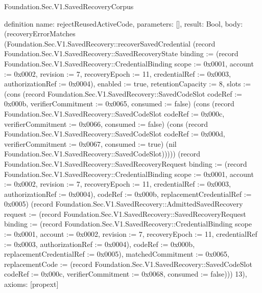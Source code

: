 \begin{lexlean}{Foundation.Sec.V1.SavedRecoveryCorpus}
\begin{semanticmodule}
definition{
  name: rejectReusedActiveCode,
  parameters: [],
  result: Bool,
  body: (recoveryErrorMatches (Foundation.Sec.V1.SavedRecovery::recoverSavedCredential (record Foundation.Sec.V1.SavedRecovery::SavedRecoveryState {binding := (record Foundation.Sec.V1.SavedRecovery::CredentialBinding {scope := 0x0001, account := 0x0002, revision := 7, recoveryEpoch := 11, credentialRef := 0x0003, authorizationRef := 0x0004}), enabled := true, retentionCapacity := 8, slots := (cons (record Foundation.Sec.V1.SavedRecovery::SavedCodeSlot {codeRef := 0x000b, verifierCommitment := 0x0065, consumed := false}) (cons (record Foundation.Sec.V1.SavedRecovery::SavedCodeSlot {codeRef := 0x000c, verifierCommitment := 0x0066, consumed := false}) (cons (record Foundation.Sec.V1.SavedRecovery::SavedCodeSlot {codeRef := 0x000d, verifierCommitment := 0x0067, consumed := true}) (nil Foundation.Sec.V1.SavedRecovery::SavedCodeSlot))))}) (record Foundation.Sec.V1.SavedRecovery::SavedRecoveryRequest {binding := (record Foundation.Sec.V1.SavedRecovery::CredentialBinding {scope := 0x0001, account := 0x0002, revision := 7, recoveryEpoch := 11, credentialRef := 0x0003, authorizationRef := 0x0004}), codeRef := 0x000b, replacementCredentialRef := 0x0005}) (record Foundation.Sec.V1.SavedRecovery::AdmittedSavedRecovery {request := (record Foundation.Sec.V1.SavedRecovery::SavedRecoveryRequest {binding := (record Foundation.Sec.V1.SavedRecovery::CredentialBinding {scope := 0x0001, account := 0x0002, revision := 7, recoveryEpoch := 11, credentialRef := 0x0003, authorizationRef := 0x0004}), codeRef := 0x000b, replacementCredentialRef := 0x0005}), matchedCommitment := 0x0065, replacementCode := (record Foundation.Sec.V1.SavedRecovery::SavedCodeSlot {codeRef := 0x000c, verifierCommitment := 0x0068, consumed := false})})) 13),
  axioms: [propext]
}


\end{semanticmodule}
\end{lexlean}
